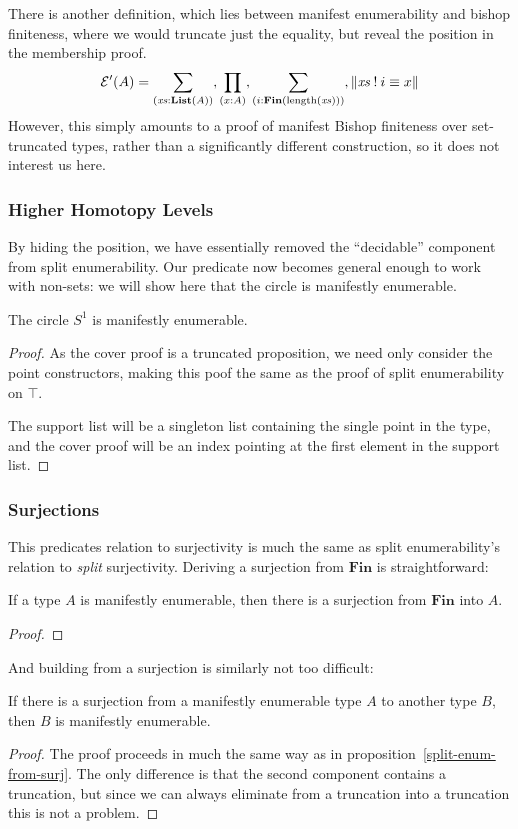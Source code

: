 \begin{refsection}
There is another definition, which lies between manifest enumerability and
bishop finiteness, where we would truncate just the equality, but reveal the
position in the membership proof.
\begin{equation}
  \mathcal{E}'(A) = \sum_{(\mathit{xs} : \mathbf{List}(A))} , \prod_{(x : A)} , \sum_{(i : \textbf{Fin}(\text{length}(\mathit{xs})))} , \lVert \mathit{xs} \mathbin{!} i \equiv x \rVert
\end{equation}
However, this simply amounts to a proof of manifest Bishop finiteness over
set-truncated types, rather than a significantly different construction, so it
does not interest us here.
\subsubsection{Higher Homotopy Levels}
By hiding the position, we have essentially removed the ``decidable'' component
from split enumerability.
Our predicate now becomes general enough to work with non-sets: we will show
here that the circle is manifestly enumerable.
\begin{theorem}
  The circle \(S^1\) is manifestly enumerable.
\end{theorem}
\begin{proof}
  As the cover proof is a truncated proposition, we need only consider the point
  constructors, making this poof the same as the proof of split enumerability on
  \(\top\).

  The support list will be a singleton list containing the single point in the
  type, and the cover proof will be an index pointing at the first element in
  the support list.

\end{proof}
\subsubsection{Surjections}
This predicates relation to surjectivity is much the same as split
enumerability's relation to \emph{split} surjectivity.
Deriving a surjection from \(\mathbf{Fin}\) is straightforward:
\begin{lemma}
  If a type \(A\) is manifestly enumerable, then there is a surjection from
  \(\mathbf{Fin}\) into \(A\).
\end{lemma}
\begin{proof}
\end{proof}
And building from a surjection is similarly not too difficult:
\begin{lemma}
  If there is a surjection from a manifestly enumerable type \(A\) to another
  type \(B\), then \(B\) is manifestly enumerable.
\end{lemma}
\begin{proof}
  The proof proceeds in much the same way as in
  proposition~\ref{split-enum-from-surj}.
  The only difference is that the second component contains a truncation, but
  since we can always eliminate from a truncation into a truncation this is not
  a problem.


\end{proof}
\end{refsection}
